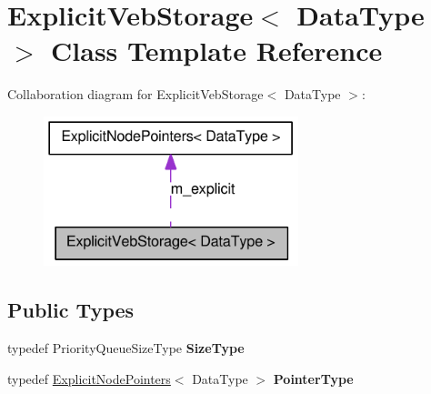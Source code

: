 \hypertarget{class_explicit_veb_storage}{
\section{ExplicitVebStorage$<$ DataType $>$ Class Template Reference}
\label{class_explicit_veb_storage}
}


Collaboration diagram for ExplicitVebStorage$<$ DataType $>$:\nopagebreak
\begin{figure}[H]
\begin{center}
\leavevmode
\includegraphics[width=210pt]{class_explicit_veb_storage__coll__graph}
\end{center}
\end{figure}
\subsection*{Public Types}
\begin{DoxyCompactItemize}
\item 
\hypertarget{class_explicit_veb_storage_a0ba89ce77e6f2be78b53fefea41ff34f}{
typedef PriorityQueueSizeType {\bfseries SizeType}}
\label{class_explicit_veb_storage_a0ba89ce77e6f2be78b53fefea41ff34f}

\item 
\hypertarget{class_explicit_veb_storage_ab84273cf0cada561524dad74dc23a838}{
typedef \hyperlink{class_explicit_node_pointers}{ExplicitNodePointers}$<$ DataType $>$ {\bfseries PointerType}}
\label{class_explicit_veb_storage_ab84273cf0cada561524dad74dc23a838}

\end{DoxyCompactItemize}
